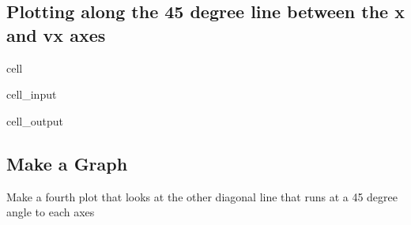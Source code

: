 \documentclass[letterpaper,10pt,english]{jupyterBook}
\begin{document}
\subsection{Plotting along the 45 degree line between the x and vx axes}
\label{\detokenize{content/1_mechanics/dynamical_1:plotting-along-the-45-degree-line-between-the-x-and-vx-axes}}
\begin{sphinxuseclass}{cell}\begin{sphinxVerbatimInput}

\begin{sphinxuseclass}{cell_input}
\begin{sphinxVerbatim}[commandchars=\\\{\}]
  

  
  

  
\end{sphinxVerbatim}

\end{sphinxuseclass}\end{sphinxVerbatimInput}
\begin{sphinxVerbatimOutput}

\begin{sphinxuseclass}{cell_output}
\noindent{}

\end{sphinxuseclass}\end{sphinxVerbatimOutput}

\end{sphinxuseclass}

\subsection{Make a Graph}
\label{\detokenize{content/1_mechanics/dynamical_1:make-a-graph}}
\sphinxAtStartPar
{}

\sphinxAtStartPar
Make a fourth plot that looks at the other diagonal line that runs at a 45 degree angle to each axes
\end{document}

